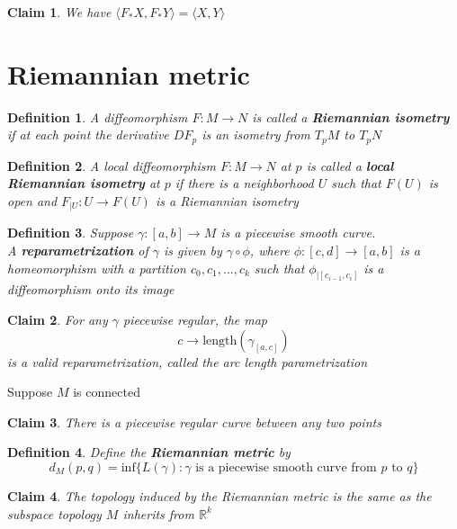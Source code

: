 \documentclass{article}
\newtheorem{definition}{Definition}
\newtheorem{claim}{Claim}
\begin{document}
\begin{claim}
    We have $\langle F_*X , F_*Y \rangle = \langle X , Y \rangle $
\end{claim}

\section{Riemannian metric}

\begin{definition}
    A diffeomorphism $F:M \to N$ is called a \textbf{Riemannian isometry} if at each point the derivative $DF_p$ is an isometry from $T_pM$ to $T_pN$
\end{definition}

\begin{definition}
    A local diffeomorphism  $F: M \to N$ at $p$ is called a \textbf{local Riemannian isometry} at $p$ if there is a neighborhood $U$ such that $F(U)$ is open and $F_{|U}:U \to F(U)$ is a Riemannian isometry
\end{definition}

\begin{definition}
    Suppose $\gamma:[a,b] \to M$ is a piecewise smooth curve. \\ A \textbf{reparametrization} of $\gamma$ is given by $\gamma \circ \phi$, where $\phi:[c,d] \to [a,b]$ is a homeomorphism with a partition $c_0,c_1,\dots,c_k$ such that $\phi_{|[c_{i-1},c_i]}$ is a diffeomorphism onto its image
\end{definition}

\begin{claim}
    For any $\gamma$ piecewise regular, the map \[c \to \text{length}(\gamma_{[a,c]})\] is a valid reparametrization, called the arc length parametrization
\end{claim}

Suppose $M$ is connected

\begin{claim}
    There is a piecewise regular curve between any two points
\end{claim}

\begin{definition}
    Define the \textbf{Riemannian metric} by \[d_M(p,q)=\text{inf}\{L(\gamma):\gamma \text{ is a piecewise smooth curve from }p \text{ to }q\}\]
\end{definition}

\begin{claim}
    The topology induced by the Riemannian metric is the same as the subspace topology $M$ inherits from $\mathbb{R}^k$
\end{claim}
\end{document}
